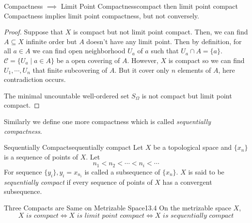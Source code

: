 \documentclass[12pt, a4paper, twoside]{article}
\newcommand{\CC}{{\mathcal {C}}} \newcommand{\CD}{{\mathcal {D}}}
\theoremstyle{plain}
\begin{document}
\begin{thm}{Compactness $\implies$ Limit Point Compactness}{compact then limit point compact}
    Compactness implies limit point compactness, but not conversely.
\end{thm}

\begin{proof}
    Suppose that $X$ is compact but not limit point compact. 
    Then, we can find $A \subseteq X$ infinite order but $A$ doesn't have any limit point. 
    Then by definition, for all $a \in A$ we can find open neighborhood $U_a$ of $a$ such that $U_a \cap A = \{a\}$. 
    $\CC = \{U_a \mid a \in A\}$ be a open covering of $A$. However, $X$ is compact so we can find 
    $U_1, \cdots, U_n$ that finite subcovering of $A$. But it cover only $n$ elements of $A$, here contradiction occurs. 
    
    The minimal uncountable well-ordered set $S_\Omega$ is not compact but limit point compact. 
\end{proof}

Similarly we define one more compactness which is called \textit{sequentially compactness}. 

\begin{defn}{Sequentially Compact}{sequentially compact}
    Let $X$ be a topological space and $\{x_n\}$ is a sequence of points of $X$. Let 
    \[n_1 < n_2 < \cdots < n_i < \cdots\]
    For sequence $\{y_i\}, y_i = x_{n_i}$ is called a subsequence of $\{x_n\}$. 
    $X$ is said to be \textit{sequentially compact} if every sequence of points of $X$ has a 
    convergent subsequence. 
\end{defn}

\newpage 

\begin{thm}{Three Compacts are Same on Metrizable Space}{13.4}
    On the metrizable space $X$, 
    \[X \textit{ is compact} \iff X \textit{ is limit point compact} \iff X \textit{ is sequentially compact}\]
\end{thm}
\end{document}
